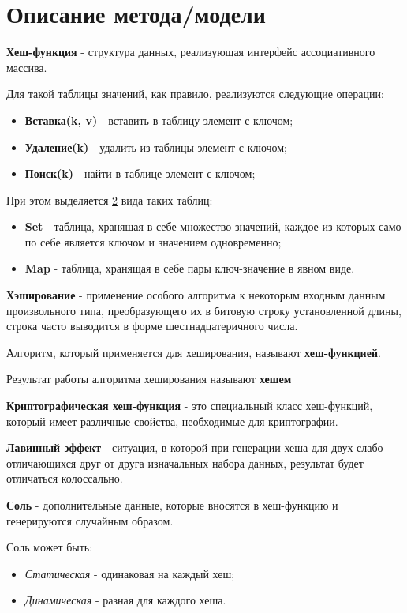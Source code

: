\documentclass[12pt, a4paper]{report}
\begin{document}
	\section*{Описание метода/модели}
	\large
	\textbf{Хеш-функция} - структура данных, реализующая интерфейс ассоциативного массива. \par
	Для такой таблицы значений, как правило, реализуются следующие операции:
	\begin{itemize}
		\item \textbf{Вставка(k, v)} - вставить в таблицу элемент с ключом;
		\item \textbf{Удаление(k)} - удалить из таблицы элемент с ключом;
		\item \textbf{Поиск(k)} - найти в таблице элемент с ключом;
	\end{itemize}
	При этом выделяется \underline{2} вида таких таблиц:
	\begin{itemize}
		\item \textbf{Set} - таблица, хранящая в себе множество значений, каждое из которых само по себе является ключом и значением одновременно;
		\item \textbf{Map} - таблица, хранящая в себе пары ключ-значение в явном виде.
	\end{itemize}

	\textbf{Хэширование} - применение особого алгоритма к некоторым входным данным произвольного типа, преобразующего их в битовую строку установленной длины, строка часто выводится в форме шестнадцатеричного числа. \par
	Алгоритм, который применяется для хеширования, называют \textbf{хеш-функцией}. \par
	Результат работы алгоритма хеширования называют \textbf{хешем} \par
	\textbf{Криптографическая хеш-функция} - это специальный класс хеш-функций, который имеет различные свойства, необходимые для криптографии. \par
	\textbf{Лавинный эффект} - ситуация, в которой при генерации хеша для двух слабо отличающихся друг от друга изначальных набора данных, результат будет отличаться колоссально. \par
	\textbf{Соль} - дополнительные данные, которые вносятся в хеш-функцию и генерируются случайным образом. \par
	Соль может быть:
	\begin{itemize}
		\item \textit{Статическая} - одинаковая на каждый хеш;
		\item \textit{Динамическая} - разная для каждого хеша.
	\end{itemize}
\end{document}
